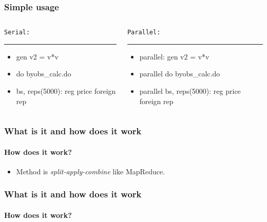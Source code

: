 \documentclass[9pt,\ExtraDocOpts]{beamer}
\begin{document}
\begin{frame}
\frametitle{Simple usage}

\begin{columns}
\begin{column}{.5\textwidth}
{\color{gray}
{\tt Serial: }
\rule{\linewidth}{4pt}}
\begin{itemize}
\item gen v2 = v*v
\item do byobs\_calc.do
\item bs, reps(5000): reg price foreign rep\pause{}
\end{itemize}
\end{column}%
\hfill%
\begin{column}{.5\textwidth}
{\color{gray}
{\tt Parallel:}
\rule{\linewidth}{4pt}}
\begin{itemize}
\item parallel: gen v2 = v*v
\item parallel do byobs\_calc.do
\item parallel bs, reps(5000): reg price foreign rep
\end{itemize}
\end{column}%
\end{columns}
\end{frame}

\begin{frame} %
\frametitle{What is it and how does it work}
\framesubtitle{How does it work?}

\begin{itemize}
\item Method is \textit{split-apply-combine} like MapReduce.
\end{itemize}
\end{frame}


\begin{frame}[b]
\frametitle{What is it and how does it work}
\framesubtitle{How does it work?}
\begin{figure}
\centering
\scalebox{.7}{}
\end{figure}
\end{frame}
\end{document}
